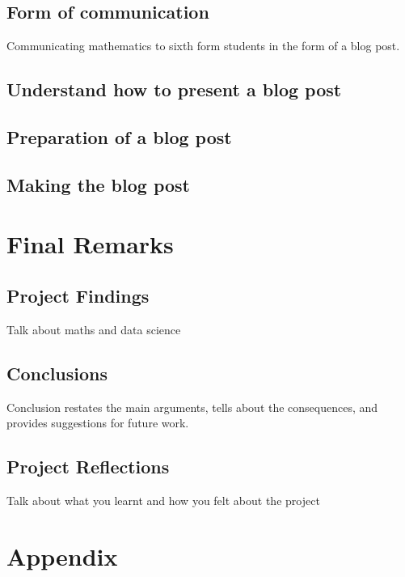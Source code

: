 \documentclass[12pt, a4paper,oneside]{book}
\numberwithin{equation}{section}
\begin{document}

\section{Form of communication}\label{sec:x.x}

Communicating mathematics to sixth form students in the form of a blog post.

\section{Understand how to present a blog post}\label{sec:x.x}


\section{Preparation of a blog post}\label{sec:x.x}


\section{Making the blog post}\label{sec:x.x}


\chapter{Final Remarks}\label{ch:concl}
\section{Project Findings}
Talk about maths and data science

\section{Conclusions}
Conclusion restates the main arguments, tells about the consequences, and provides suggestions for future work.

\section{Project Reflections}
Talk about what you learnt and how you felt about the project

\chapter*{Appendix}
\appendix
{}
\end{document}
